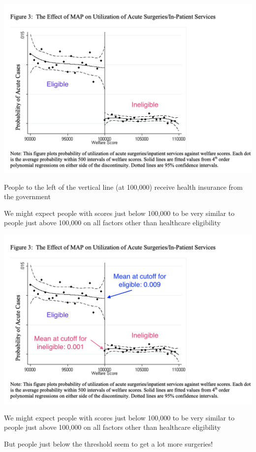 \documentclass[11pt,english,handout]{beamer}
\newenvironment{wideitemize}{\itemize\addtolength{\itemsep}{10pt}}{\enditemize}
\begin{document}
	\begin{frame}
	\centering
	\includegraphics[width = 0.7\linewidth]{hou-rdd-eligibility}
	\begin{wideitemize}
		\item
		People to the left of the vertical line (at 100,000) receive health insurance from the government
		
		\item
		We might expect people with scores just below 100,000 to be very similar to people just above 100,000 on all factors other than healthcare eligibility
	\end{wideitemize}	
\end{frame}

	\begin{frame}
	\centering
	\includegraphics[width = 0.7\linewidth]{hou-rdd-means}
	\begin{wideitemize}
		\item
		We might expect people with scores just below 100,000 to be very similar to people just above 100,000 on all factors other than healthcare eligibility
		
		\item
		But people just below the threshold seem to get a lot more surgeries!
	\end{wideitemize}	
\end{frame}
\end{document}
